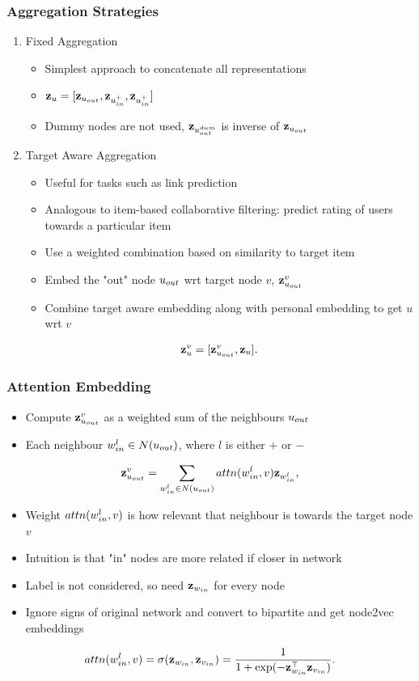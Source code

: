 \documentclass{beamer}
\begin{document}
\begin{frame}
    \frametitle{Aggregation Strategies}
    \begin{enumerate}
        \item Fixed Aggregation
        \begin{itemize}
            \item Simplest approach to concatenate all representations
            \item $\mathbf{z}_{u} = [\mathbf{z}_{u_{out}},\mathbf{z}_{u_{in}^{+}},\mathbf{z}_{u_{in}^{+}}]$
            \item Dummy nodes are not used, $\mathbf{z}_{u_{out}^{dum}}$ is inverse of $\mathbf{z}_{u_{out}}$
        \end{itemize}
    \item Target Aware Aggregation
    \begin{itemize}
        \item Useful for tasks such as link prediction
        \item Analogous to item-based collaborative filtering: predict rating of users towards a particular item 
        \item Use a weighted combination based on similarity to target item
        \item Embed the "out" node $u_{out}$ wrt target node $v$, $\mathbf{z}_{u_{out}}^{v}$
        \item Combine target aware embedding along with personal embedding to get $u$ wrt $v$
    \end{itemize}
    \[ \mathbf{z}_{u}^{v} = [\mathbf{z}_{u_{out}}^{v},\mathbf{z}_{u}].\]
    \end{enumerate}
\end{frame}

\begin{frame}
    \frametitle{Attention Embedding}
    \begin{itemize}
        \item Compute $\mathbf{z}_{u_{out}}^{v}$ as a weighted sum of the neighbours $u_{out}$
        \item Each neighbour $w_{in}^{l} \in N(u_{out})$, where $l$ is either $+$ or $-$
    \end{itemize}
    \[\mathbf{z}_{u_{out}}^{v}  = \sum_{w_{in}^{l} \in N(u_{out})} attn(w_{in}^{l},v)\mathbf{z}_{w_{in}^{l}},\]
    \begin{itemize}
        \item Weight $attn(w_{in}^{l},v)$ is how relevant that neighbour is towards the target node $v$
        \item Intuition is that "in" nodes are more related if closer in network
        \item Label is not considered, so need $\mathbf{z}_{w_{in}}$ for every node 
        \item Ignore signs of original network and convert to bipartite and get node2vec embeddings
    \end{itemize}    
    \[ attn(w_{in}^{l},v) = \sigma(\mathbf{z}_{w_{in}},\mathbf{z}_{v_{in}}) = \frac{1}{1+\exp(-\mathbf{z}_{w_{in}}^{\top}\mathbf{z}_{v_{in}})} .
    \]
\end{frame}
\end{document}
